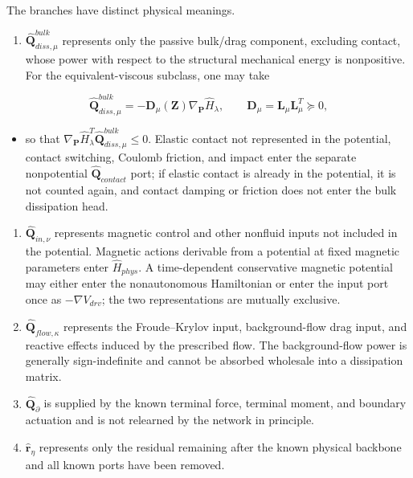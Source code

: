 The branches have distinct physical meanings.

\begin{enumerate}
\def\labelenumi{\arabic{enumi}.}
\tightlist
\item
  \({\widehat{\mathbf{Q}}}_{diss,\mu}^{bulk}\) represents only the passive bulk/drag component, excluding contact, whose power with respect to the structural mechanical energy is nonpositive. For the equivalent-viscous subclass, one may take
\end{enumerate}

\begin{equation}
\label{eq:chnn-4-19}
{\widehat{\mathbf{Q}}}_{diss,\mu}^{bulk} = - \mathbf{D}_{\mu}\left( \mathbf{Z} \right)\nabla_{\mathbf{P}}{\widehat{H}}_{\lambda},\quad\quad\mathbf{D}_{\mu} = \mathbf{L}_{\mu}\mathbf{L}_{\mu}^{T} \succcurlyeq 0,
\end{equation}

\begin{itemize}
\tightlist
\item
  so that \(\nabla_{\mathbf{P}}{\widehat{H}}_{\lambda}^{T}{\widehat{\mathbf{Q}}}_{diss,\mu}^{bulk} \leq 0\). Elastic contact not represented in the potential, contact switching, Coulomb friction, and impact enter the separate nonpotential \({\widehat{\mathbf{Q}}}_{contact}\) port; if elastic contact is already in the potential, it is not counted again, and contact damping or friction does not enter the bulk dissipation head.\cite{Zhong2020Dissipative}
\end{itemize}

\begin{enumerate}
\def\labelenumi{\arabic{enumi}.}
\setcounter{enumi}{1}
\tightlist
\item
  \({\widehat{\mathbf{Q}}}_{in,\nu}\) represents magnetic control and other nonfluid inputs not included in the potential. Magnetic actions derivable from a potential at fixed magnetic parameters enter \({\widehat{H}}_{phys}\). A time-dependent conservative magnetic potential may either enter the nonautonomous Hamiltonian or enter the input port once as \(-\nabla V_{drv}\); the two representations are mutually exclusive.
\item
  \({\widehat{\mathbf{Q}}}_{flow,\kappa}\) represents the Froude--Krylov input, background-flow drag input, and reactive effects induced by the prescribed flow. The background-flow power is generally sign-indefinite and cannot be absorbed wholesale into a dissipation matrix.
\item
  \({\widehat{\mathbf{Q}}}_{\partial}\) is supplied by the known terminal force, terminal moment, and boundary actuation and is not relearned by the network in principle.
\item
  \({\widehat{\mathbf{r}}}_{\eta}\) represents only the residual remaining after the known physical backbone and all known ports have been removed.
\end{enumerate}

